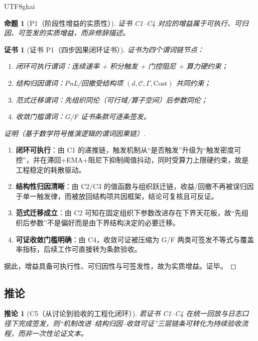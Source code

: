 \documentclass[12pt]{article}
\newtheorem{proposition}{命题}[section]
\newtheorem{corollary}{推论}[section]
\newtheorem{Certificate}{证书}[section]
\begin{document}
\begin{CJK*}{UTF8}{gkai}
\begin{proposition}[P1（阶段性增益的实质性）]
\label{prop:tex28-ch13-p1}
证书 C1--C4 对应的增益属于可执行、可归因、可签发的实质增益，而非修辞描述。
\end{proposition}

\begin{Certificate}[证书 P1（四步因果闭环证书）]
\label{cert:tex28-ch13-p1}
证书为四个谓词链节点：
\begin{enumerate}
  \item 闭环可执行谓词：连续速率 + 积分触发 + 门控阻尼 + 算力硬约束；
  \item 结构归因谓词：PnL/回撤受结构项 $(d,\mathcal{C},\Gamma,\mathrm{Cost})$ 共同约束；
  \item 范式迁移谓词：先组织同伦（可行域/算子空间）后参数同伦；
  \item 收敛门槛谓词：G/F 证书条款可逐条签发。
\end{enumerate}
\end{Certificate}

\begin{proof}[证明（基于数学符号推演逻辑的谓词因果链）]
\begin{enumerate}
  \item \textbf{闭环可执行}：由 C1 的递推链，触发机制从“是否触发”升级为“触发密度可控”，并在滞回+EMA+阻尼下抑制阈值抖动，同时受算力上限硬约束，故是工程稳定的耗散驱动。
  \item \textbf{结构性归因清晰}：由 C2/C3 的值函数与组织跃迁链，收益/回撤不再被误归因于单一触发律，而被放回结构项共因框架，结论可复核且可反证。
  \item \textbf{范式迁移成立}：由 C2 可知在固定组织下参数改进存在下界天花板，故“先组织后参数”不是偏好而是由下界结构决定的必要迁移。
  \item \textbf{可证收敛门槛明确}：由 C4，收敛可证被压缩为 G/F 两类可签发不等式与覆盖率指标，后续工作可直接转为条款验收。
\end{enumerate}
据此，增益具备可执行性、可归因性与可签发性，故为实质增益。证毕。
\end{proof}

\subsection{推论}
\label{subsec:tex28-ch13-corollary}

\begin{corollary}[C5（从讨论到验收的工程化闭环）]
\label{cor:tex28-ch13-c5}
若证书 C1--C4 在统一回放与日志口径下完成签发，则“机制改进--结构归因--收敛可证”三层链条可转化为持续验收流程，而非一次性论证文本。
\end{corollary}


\end{CJK*}
\end{document}
